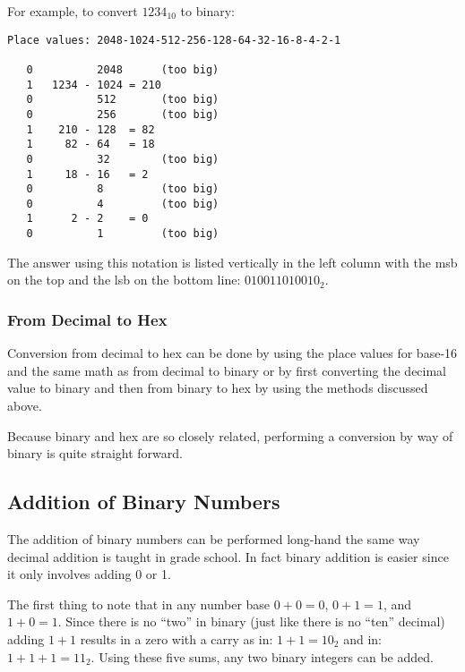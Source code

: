 For example, to convert $1234_{10}$ to binary:

\begin{verbatim}
Place values: 2048-1024-512-256-128-64-32-16-8-4-2-1

   0          2048      (too big)
   1   1234 - 1024 = 210
   0          512       (too big)
   0          256       (too big)
   1    210 - 128  = 82
   1     82 - 64   = 18
   0          32        (too big)
   1     18 - 16   = 2
   0          8         (too big)
   0          4         (too big)
   1      2 - 2    = 0
   0          1         (too big)
\end{verbatim}

The answer using this notation is listed vertically
in the left column with the \acrshort{msb} on the top and 
the \acrshort{lsb} on the bottom line: $010011010010_2$.


\subsubsection{From Decimal to Hex}

Conversion from decimal to hex can be done by using the place
values for base-16 and the same math as from decimal to binary
or by first converting the decimal value to binary and then
from binary to hex by using the methods discussed above.

Because binary and hex are so closely related, performing
a conversion by way of binary is quite straight forward.


\subsection{Addition of Binary Numbers}

The addition of binary numbers can be performed long-hand the
same way decimal addition is taught in grade school.  In fact binary
addition is easier since it only involves adding 0 or 1.

The first thing to note that in any number base $0+0=0$, $0+1=1$, and 
$1+0=1$.  Since there is no ``two'' in binary (just like there is 
no ``ten'' decimal) adding $1+1$ results in a zero with a carry as
in: $1+1=10_2$ and in: $1+1+1=11_2$.  Using these five sums, any two
binary integers can be added.

